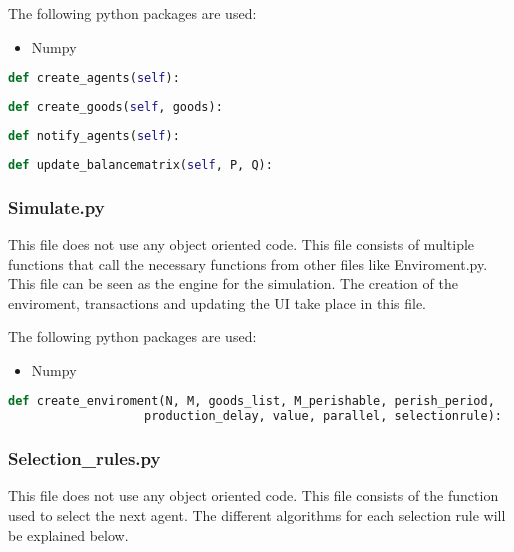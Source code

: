 \documentclass{article}
\begin{document}
The following python packages are used:
\begin{itemize}
  \item Numpy
\end{itemize}


\begin{lstlisting}[language=Python]
def create_agents(self):
\end{lstlisting}

\begin{lstlisting}[language=Python]
def create_goods(self, goods):
\end{lstlisting}

\begin{lstlisting}[language=Python]
def notify_agents(self):
\end{lstlisting}

\begin{lstlisting}[language=Python]
def update_balancematrix(self, P, Q):
\end{lstlisting}



\subsubsection{Simulate.py}
This file does  not use any object oriented code. This file consists of multiple functions that call the necessary functions from other files like Enviroment.py. This file can be seen as the engine for the simulation. The creation of the enviroment, transactions and updating the UI take place in this file.

The following python packages are used:
\begin{itemize}
  \item Numpy
\end{itemize}


\begin{lstlisting}[language=Python]
def create_enviroment(N, M, goods_list, M_perishable, perish_period,
			       production_delay, value, parallel, selectionrule):
\end{lstlisting}

\subsubsection{Selection\_rules.py}
This file does not use any object oriented code. This file consists of the function used to select the next agent. The different algorithms for each selection rule will be explained below.
\end{document}
